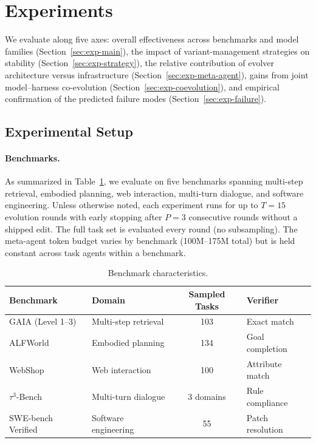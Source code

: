 \section{Experiments}
\label{sec:experiments}

We evaluate \ProjectName along five axes: overall effectiveness across benchmarks and model families (Section~\ref{sec:exp-main}), the impact of variant-management strategies on stability (Section~\ref{sec:exp-strategy}), the relative contribution of evolver architecture versus infrastructure (Section~\ref{sec:exp-meta-agent}), gains from joint model--harness co-evolution (Section~\ref{sec:exp-coevolution}), and empirical confirmation of the predicted failure modes (Section~\ref{sec:exp-failure}).

\subsection{Experimental Setup}
\label{sec:exp-setup}

\paragraph{Benchmarks.}
As summarized in Table~\ref{tab:benchmarks}, we evaluate on five benchmarks spanning multi-step retrieval, embodied planning, web interaction, multi-turn dialogue, and software engineering. Unless otherwise noted, each experiment runs for up to $T{=}15$ evolution rounds with early stopping after $P{=}3$ consecutive rounds without a shipped edit. The full task set is evaluated every round (no subsampling). The meta-agent token budget varies by benchmark (100M--175M total) but is held constant across task agents within a benchmark.

\begin{table}[!htbp]
\centering
\small
\caption{Benchmark characteristics.}
\label{tab:benchmarks}
\begin{tabular}{llcl}
\toprule
\textbf{Benchmark} & \textbf{Domain} & \textbf{Sampled Tasks} & \textbf{Verifier} \\
\midrule
GAIA (Level 1--3) & Multi-step retrieval & 103 & Exact match \\
ALFWorld & Embodied planning & 134 & Goal completion \\
WebShop & Web interaction & 100 & Attribute match \\
$\tau^3$-Bench & Multi-turn dialogue & 3 domains & Rule compliance \\
SWE-bench Verified & Software engineering & 55 & Patch resolution \\
\bottomrule
\end{tabular}
\end{table}

